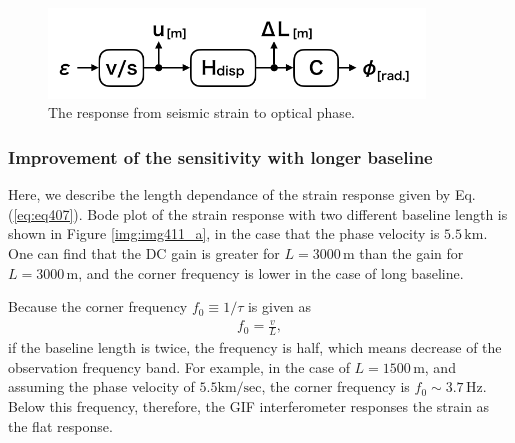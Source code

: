 \begin{figure}[h]
  \centering
  \includegraphics[width=10.0cm]{./img_chap4/img411.png}
  \caption{The response from seismic strain to optical phase.} \label{img:img411}
\end{figure}

\subsubsection{Improvement of the sensitivity with longer baseline}
Here, we describe the length dependance of the strain response given by Eq.(\ref{eq:eq407}). Bode plot of the strain response with two different baseline length is shown in Figure  \ref{img:img411_a}, in the case that the phase velocity is $5.5\,\mathrm{km}$. One can find that the DC gain is greater for $L=3000\,\mathrm{m}$ than the gain for $L=3000\,\mathrm{m}$, and the corner frequency is lower in the case of long baseline.

Because the corner frequency $f_0\equiv {1}/{\tau}$ is given as
\begin{eqnarray}
  f_0 = \frac{v}{L},
\end{eqnarray}
if the baseline length is twice, the frequency is half, which means decrease of the observation frequency band. For example, in the case of $L=1500\,\mathrm{m}$, and assuming the phase velocity of $5.5 \mathrm{km/sec}$, the corner frequency is $f_0\sim3.7\,\mathrm{Hz}$. Below this frequency, therefore, the GIF interferometer responses the strain as the flat response.

